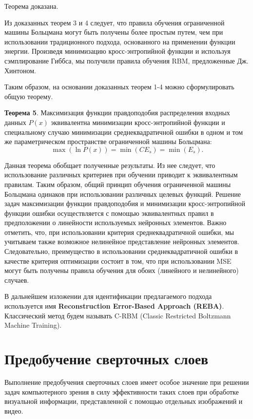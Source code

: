 Теорема доказана.

Из доказанных теорем 3 и 4 следует, что правила обучения ограниченной машины Больцмана могут быть получены более простым путем, чем при использовании традиционного подхода, основанного на применении функции энергии. Произведя минимизацию кросс-энтропийной функции и используя сэмплирование Гиббса, мы получили правила обучения RBM, предложенные Дж. Хинтоном.

Таким образом, на основании доказанных теорем 1-4 можно сформулировать общую теорему.

\textbf{Теорема 5}. Максимизация функции правдоподобия распределения входных данных $P(x)$ эквивалентна минимизации кросс-энтропийной функции и специальному случаю минимизации среднеквадратичной ошибки в одном и том же параметрическом пространстве ограниченной машины Больцмана:
\begin{equation}
	\max(\ln P(x)) = \min(CE_s) = \min(E_s).
\end{equation}

Данная теорема обобщает полученные результаты. Из нее следует, что использование различных критериев при обучении приводит к эквивалентным правилам. Таким образом, общий принцип обучения ограниченной машины Больцмана одинаков при использовании различных целевых функций. Решение задач максимизации функции правдоподобия и минимизации кросс-энтропийной функции ошибки осуществляется с помощью эквивалентных правил в предположении о линейности используемых нейронных элементов. Важно отметить, что, при использовании критерия среднеквадратичной ошибки, мы учитываем также возможное нелинейное представление нейронных элементов. Следовательно, преимущество в использовании среднеквадратичной ошибки в качестве критерия оптимизации состоит в том, что при использовании MSE могут быть получены правила обучения для обоих (линейного и нелинейного) случаев.

В дальнейшем изложении для идентификации предлагаемого подхода используется имя \textbf{Reconstruction Error-Based Approach (REBA)}. Классический метод будем называть C-RBM (Classic Restricted Boltzmann Machine Training).

\section{Предобучение сверточных слоев}

Выполнение предобучения сверточных слоев имеет особое значение при решении задач компьютерного зрения в силу эффективности таких слоев при обработке визуальной информации, представленной с помощью отдельных изображений и видео.


